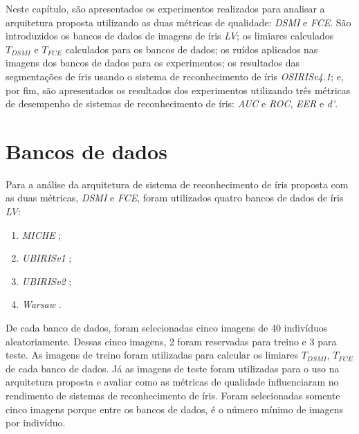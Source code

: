 
\par Neste capítulo, são apresentados os experimentos realizados para analisar a arquitetura proposta utilizando as duas métricas de qualidade: \textit{\acrshort{DSMI}} e \textit{\acrshort{FCE}}. São introduzidos os bancos de dados de imagens de íris \textit{\acrshort{LV}}; os limiares calculados $T_{DSMI}$ e $T_{FCE}$ calculados para os bancos de dados; os ruídos aplicados nas imagens dos bancos de dados para os experimentos; os resultados das segmentações de íris usando o sistema de reconhecimento de íris \textit{OSIRISv4.1}; e, por fim, são apresentados os resultados dos experimentos utilizando três métricas de desempenho de sistemas de reconhecimento de íris: \textit{\acrfull{AUC}} e \textit{ \acrfull{ROC}}, \textit{\acrfull{EER}} e \textit{\acrfull{d'}}.


\section{Bancos de dados} \label{sec:experimentos:db}

\par Para a análise da arquitetura de sistema de reconhecimento de íris proposta com as duas métricas, \textit{\acrshort{DSMI}} e \textit{\acrshort{FCE}}, foram utilizados quatro bancos de dados de íris \textit{\acrshort{LV}}: 

\begin{enumerate}
    \item \textit{MICHE} \cite{marsico2017-MICHE-1, santada2016-MICHE-2, miche};
    \item \textit{UBIRISv1} \cite{proenca2005-ubirisv1, ubirisv1};
    \item \textit{UBIRISv2} \cite{proence2010-ubirisv2, ubirisv2};
    \item \textit{\acrfull{Warsaw}} \cite{trokielwicz2016-Warsaw, warsaw}.
\end{enumerate}

\par De cada banco de dados, foram selecionadas cinco imagens de 40 indivíduos aleatoriamente. Dessas cinco imagens, 2 foram reservadas para treino e 3 para teste. As imagens de treino foram utilizadas para calcular os limiares $T_{DSMI}$, $T_{FCE}$ de cada banco de dados. Já as imagens de teste foram utilizadas para o uso na arquitetura proposta e avaliar como as métricas de qualidade influenciaram no rendimento de sistemas de reconhecimento de íris. Foram selecionadas somente cinco imagens porque entre os bancos de dados, é o número mínimo de imagens por indivíduo.

